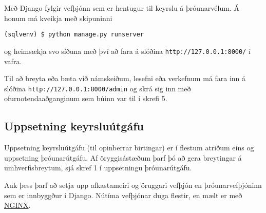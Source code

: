 Með Django fylgir vefþjónn sem er hentugur til keyrslu á þróunarvélum. Á
honum má kveikja með skipuninni

\begin{verbatim}
(sqlvenv) $ python manage.py runserver
\end{verbatim}

og heimsækja svo síðuna með því að fara á slóðina
\texttt{http://127.0.0.1:8000/} í vafra.

Til að breyta eða bæta við námskeiðum, lesefni eða verkefnum má fara inn
á slóðina \texttt{http://127.0.0.1:8000/admin} og skrá sig inn með
ofurnotendaaðganginum sem búinn var til í skrefi 5.

\subsection*{Uppsetning
keyrsluútgáfu}\label{uppsetning-keyrsluuxfatguxe1fu}

Uppsetning keyrsluútgáfu (til opinberrar birtingar) er í flestum atriðum
eins og uppsetning þróunarútgáfu. Af öryggisástæðum þarf þó að gera
breytingar á umhverfisbreytum, sjá skref 1 í uppsetningu þróunarútgáfu.

Auk þess þarf að setja upp afkastameiri og öruggari vefþjón en
þróunarvefþjóninn sem er innbyggður í Django. Nútíma vefþjónar duga
flestir, en mælt er með \href{https://www.nginx.com/}{NGINX}.
